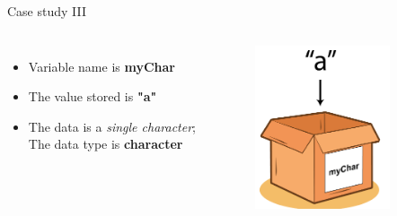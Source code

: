 \documentclass[10pt,xcolor={table,dvipsnames},t]{beamer}
\begin{document}
\begin{frame}{Case study III}
  \begin{columns}
    \begin{itemize}
      \item Variable name is \textbf{myChar}
      \item The value stored is \textbf{"a"}
      \item The data is a \textit{single character}; The data type is \textbf{character}
    \end{itemize}
    \begin{figure}
      \includegraphics[width=0.8\textwidth]{img/variable-chr.png}
    \end{figure}
  \end{columns}
\end{frame}
\end{document}
